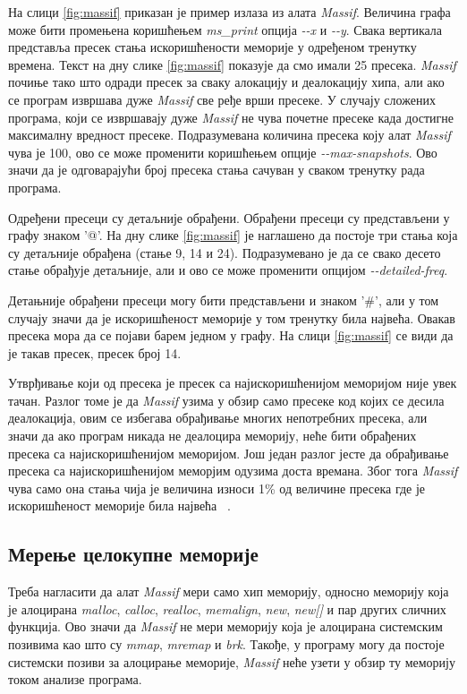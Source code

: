 \documentclass[12pt,oneside]{memoir}
\begin{document}
\indent На слици \ref{fig:massif} приказан је пример излаза из алата \textit{Massif}. Величина графа може бити промењена коришћењем \textit{ms\_print} опција \textit{-\--x} и \textit{-\--y}. Свака вертикала представља пресек стања искоришћености меморије у одређеном тренутку времена. Текст на дну слике \ref{fig:massif} показује да смо имали 25 пресека. \textit{Massif} почиње тако што одради пресек за сваку алокацију и деалокацију хипа, али ако се програм извршава дуже \textit{Massif} све ређе врши пресеке. У случају сложених програма, који се извршавају дуже \textit{Massif} не чува почетне пресеке када достигне максималну вредност пресеке. Подразумевана количина пресека коју алат \textit{Massif} чува је 100, ово се може променити коришћењем опције \textit{-\--max-snapshots}. Ово значи да је одговарајући број пресека стања сачуван у сваком тренутку рада програма.

\indent Одређени пресеци су детаљније обрађени. Обрађени пресеци су представљени у графу знаком '@'. На дну слике \ref{fig:massif} је наглашено да постоје три стања која су детаљније обрађена (стање 9, 14 и 24). Подразумевано је да се свако десето стање обрађује детаљније, али и ово се може променити опцијом \textit{-\--detailed-freq}.

\indent Детањније обрађени пресеци могу бити представљени и знаком '\#', али у том случају значи да је искоришћеност меморије у том тренутку била највећа. Овакав пресека мора да се појави барем једном у графу. На слици \ref{fig:massif} се види да је такав пресек, пресек број 14.

\indent Утврђивање који од пресека је пресек са најискоришћенијом меморијом није увек тачан. Разлог томе је да \textit{Massif} узима у обзир само пресеке код којих се десила деалокација, овим се избегава обрађивање многих непотребних пресека, али значи да ако програм никада не деалоцира меморију, неће бити обрађених пресека са најискоришћенијом меморијом. Још један разлог јесте да обрађивање пресека са најискоришћенијом меморјим одузима доста времана. Због тога \textit{Massif} чува само она стања чија је величина износи 1\% од величине пресека где је искоришћеност меморије била највећа ~\cite{massifdRef}. 

\subsection{Мерење целокупне меморије}


\indent Треба нагласити да алат \textit{Massif} мери само хип меморију, односно меморију која је алоцирана \textit{malloc}, \textit{calloc}, \textit{realloc}, \textit{memalign}, \textit{new}, \textit{new[]} и пар других сличних функција. Ово значи да \textit{Massif} не мери меморију која је алоцирана системским позивима као што су \textit{mmap}, \textit{mremap} и \textit{brk}. Такође, у програму могу да постоје системски позиви за алоцирање меморије, \textit{Massif} неће узети у обзир ту меморију током анализе програма.
\end{document}
